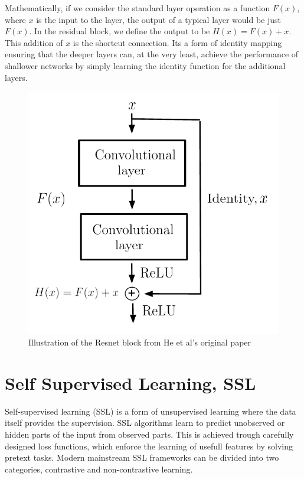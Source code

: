 Mathematically, if we consider the standard layer operation as a function $F(x)$, where $x$ is the input to the layer, the output of a typical layer would be just $F(x)$. In the residual block,
we define the output to be $H(x) = F(x) + x$. This addition of $x$ is the shortcut connection. Its a form of identity mapping ensuring that the deeper layers can, at the very least, achieve the performance of shallower
networks by simply learning the identity function for the additional layers.

\begin{figure}[H]
    \includegraphics[scale=0.6]{figures/figure-pdf/Resnet.pdf}
    \caption{Illustration of the Resnet block from He et al's original paper\cite{ResLearn} }
    \label{fig:resblock}
\end{figure}

\section{Self Supervised Learning, SSL}
Self-supervised learning (SSL) is a form of unsupervised learning where the data itself provides the supervision. SSL algorithms learn to predict unobserved or hidden parts of the input from observed parts.
This is achieved trough carefully designed loss functions, which enforce the learning of usefull features by solving pretext tasks. Modern mainstream SSL frameworks can be divided into two categories, contrastive and non-contrastive learning.


